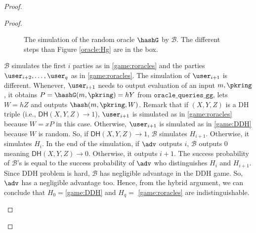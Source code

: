 \begin{proof}
\begin{proof}
\begin{enumerate}[label={{Game} }{{\arabic*}}, start = 0]
			\begin{figure}
				\centering
				
				\noindent{}	
				\caption{The simulation of the random oracle $ \hashG $ by $ \mathcal{B} $. The different steps than Figure \ref{oracle:Hg} are in the box.}
				\label{oracle:HgbyB}
			\end{figure}
			
			$ \mathcal{B} $ simulates the first $ i $ parties as in \ref{game:roracles} and the parties $ \user_{i+2}, \ldots, \user_q $ as in \ref{game:roracles}. The simulation of $ \user_{i + 1} $ is different. Whenever, $ \user_{i+1} $ needs to output evaluation of an input $ m, \pkring $, it obtains $ P = \hashG(m, \pkring) = hY $ from $ \mathtt{oracle\_queries\_gg} $, lets $ W = hZ $ and outputs $ \hash(m, \pkring, W) $. Remark that if $ (X,Y,Z)$ is a DH triple (i.e., $  \mathsf{DH}(X,Y,Z) \rightarrow 1 $), $ \user_{i+1} $ is simulated as in \ref{game:roracles} because $ W = xP $ in this case. Otherwise, $ \user_{i+1} $ is simulated as in \ref{game:DDH} because $ W $ is random. So, if $  \mathsf{DH}(X,Y,Z)  \rightarrow 1$, $ \mathcal{B} $ simulates $ H_{i+1} $. Otherwise, it simulates $ H_{i} $. In the end of the simulation, if $ \adv $ outputs $ i $, $ \mathcal{B} $ outputs $ 0 $ meaning $  \mathsf{DH}(X,Y,Z) \rightarrow 0$. Otherwise, it outputs $ i + 1 $. The success probability of $ \mathcal{B} $'s is equal to the success probability of $ \adv $ who distinguishes $ H_i $ and $ H_{i +1} $. Since DDH problem is hard, $ \mathcal{B} $ has negligible advantage in the DDH game. So, $ \adv $ has a negligible advantage too. Hence, from the hybrid argument, we can conclude that $ H_0  = $\ref{game:DDH} and $ H_q = $ \ref{game:roracles} are indistinguishable.
			

\end{enumerate}
\end{proof}
\end{proof}
